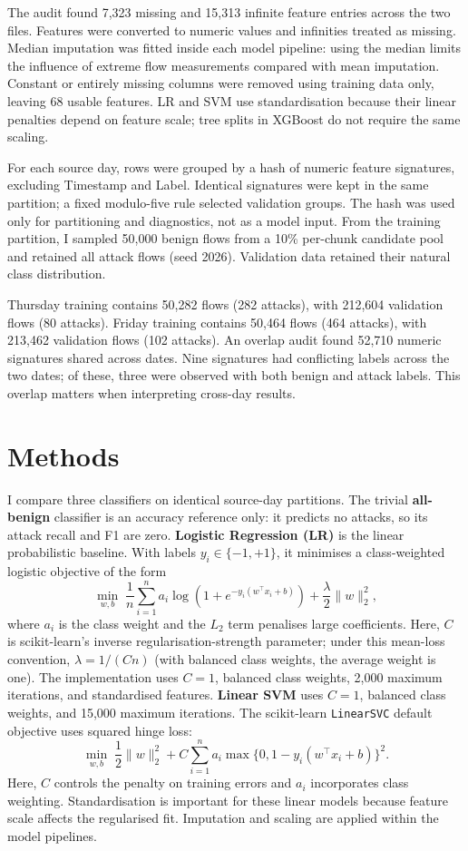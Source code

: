 \documentclass{article}
\begin{document}
The audit found 7,323 missing and 15,313 infinite feature entries across the two files. Features were converted to numeric values and infinities treated as missing. Median imputation was fitted inside each model pipeline: using the median limits the influence of extreme flow measurements compared with mean imputation. Constant or entirely missing columns were removed using training data only, leaving 68 usable features. LR and SVM use standardisation because their linear penalties depend on feature scale; tree splits in XGBoost do not require the same scaling.

For each source day, rows were grouped by a hash of numeric feature signatures, excluding Timestamp and Label. Identical signatures were kept in the same partition; a fixed modulo-five rule selected validation groups. The hash was used only for partitioning and diagnostics, not as a model input. From the training partition, I sampled 50,000 benign flows from a 10\% per-chunk candidate pool and retained all attack flows (seed 2026). Validation data retained their natural class distribution.

Thursday training contains 50,282 flows (282 attacks), with 212,604 validation flows (80 attacks). Friday training contains 50,464 flows (464 attacks), with 213,462 validation flows (102 attacks). An overlap audit found 52,710 numeric signatures shared across dates. Nine signatures had conflicting labels across the two dates; of these, three were observed with both benign and attack labels. This overlap matters when interpreting cross-day results.

\section{Methods}
I compare three classifiers on identical source-day partitions. The trivial \textbf{all-benign} classifier is an accuracy reference only: it predicts no attacks, so its attack recall and F1 are zero. \textbf{Logistic Regression (LR)} is the linear probabilistic baseline. With labels $y_i\in\{-1,+1\}$, it minimises a class-weighted logistic objective of the form
\[
\min_{w,b}\;\frac{1}{n}\sum_{i=1}^{n}a_i\log\!\left(1+e^{-y_i(w^\top x_i+b)}\right)+\frac{\lambda}{2}\|w\|_2^2,
\]
where $a_i$ is the class weight and the $L_2$ term penalises large coefficients. Here, $C$ is scikit-learn's inverse regularisation-strength parameter; under this mean-loss convention, $\lambda=1/(Cn)$ (with balanced class weights, the average weight is one). The implementation uses $C=1$, balanced class weights, 2,000 maximum iterations, and standardised features. \textbf{Linear SVM} uses $C=1$, balanced class weights, and 15,000 maximum iterations. The scikit-learn \texttt{LinearSVC} default objective uses squared hinge loss:
\[
\min_{w,b}\;\frac{1}{2}\|w\|_2^2+C\sum_{i=1}^{n}a_i\max\{0,1-y_i(w^\top x_i+b)\}^2.
\]
Here, $C$ controls the penalty on training errors and $a_i$ incorporates class weighting. Standardisation is important for these linear models because feature scale affects the regularised fit. Imputation and scaling are applied within the model pipelines.
\end{document}
